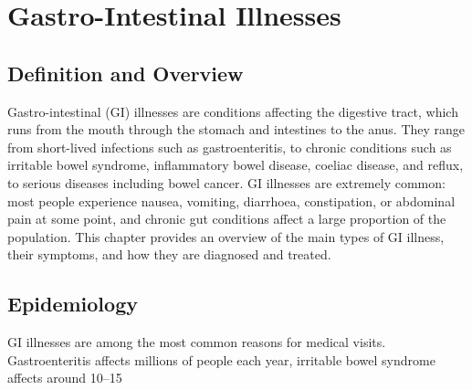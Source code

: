 \chapter{Gastro-Intestinal Illnesses}

\section*{Definition and Overview}
Gastro-intestinal (GI) illnesses are conditions affecting the digestive tract, which runs from the mouth through the stomach and intestines to the anus. They range from short-lived infections such as gastroenteritis, to chronic conditions such as irritable bowel syndrome, inflammatory bowel disease, coeliac disease, and reflux, to serious diseases including bowel cancer. GI illnesses are extremely common: most people experience nausea, vomiting, diarrhoea, constipation, or abdominal pain at some point, and chronic gut conditions affect a large proportion of the population. This chapter provides an overview of the main types of GI illness, their symptoms, and how they are diagnosed and treated.

\section*{Epidemiology}
GI illnesses are among the most common reasons for medical visits. Gastroenteritis affects millions of people each year, irritable bowel syndrome affects around 10--15%

